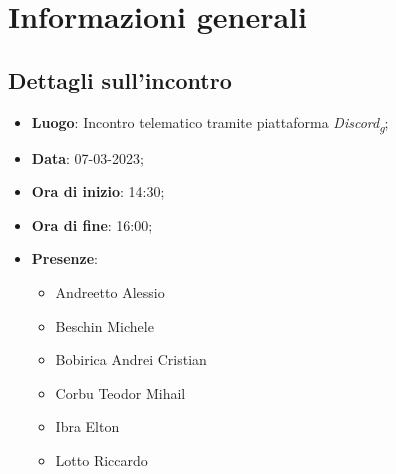 \section{Informazioni generali}

\subsection{Dettagli sull'incontro}
\begin{itemize}
\item \textbf{Luogo}: Incontro telematico tramite piattaforma \textit{Discord\textsubscript{g}};
\item \textbf{Data}: 07-03-2023;
\item \textbf{Ora di inizio}: 14:30;
\item \textbf{Ora di fine}: 16:00;
\item \textbf{Presenze}: 
\begin{itemize}
	\item Andreetto Alessio
    \item Beschin Michele
    \item Bobirica Andrei Cristian
    \item Corbu Teodor Mihail
    \item Ibra Elton
    \item Lotto Riccardo
\end{itemize}
\end{itemize}




